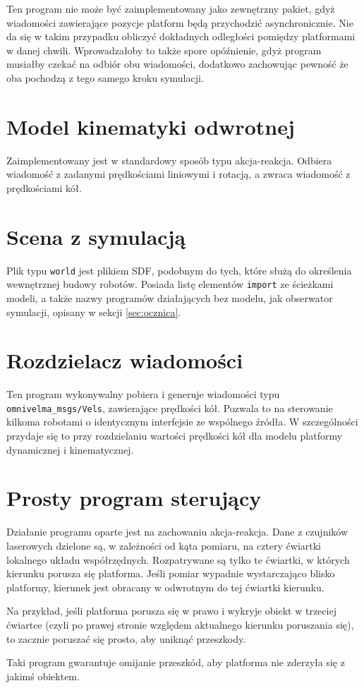 	Ten program nie może być zaimplementowany jako zewnętrzny pakiet, gdyż wiadomości zawierające pozycje platform będą przychodzić asynchronicznie.
	Nie da się w takim przypadku obliczyć dokładnych odległości pomiędzy platformami w danej chwili. 
	Wprowadzałoby to także spore opóźnienie, gdyż program musiałby czekać na odbiór obu wiadomości, dodatkowo zachowując pewność że oba pochodzą z tego samego kroku symulacji.
	
\section{Model kinematyki odwrotnej}
	Zaimplementowany jest w standardowy sposób typu akcja-reakcja.
	Odbiera wiadomość z zadanymi prędkościami liniowymi i rotacją, a zwraca wiadomość z prędkościami kół.
	
\section{Scena z symulacją}
	Plik typu \texttt{world} jest plikiem SDF, podobnym do tych, które służą do określenia wewnętrznej budowy robotów.
	Posiada listę elementów \texttt{import} ze ścieżkami modeli, a także nazwy programów działających bez modelu, jak obserwator symulacji, opisany w sekcji \ref{sec:ocznica}.

\section{Rozdzielacz wiadomości}
	Ten program wykonywalny pobiera i generuje wiadomości typu \texttt{omnivelma\_msgs/Vels}, zawierające prędkości kół.
	Pozwala to na sterowanie kilkoma robotami o identycznym interfejsie ze wspólnego źródła.
	W szczególności przydaje się to przy rozdzielaniu wartości prędkości kół dla modelu platformy dynamicznej i kinematycznej.

\section{Prosty program sterujący}
	Działanie programu oparte jest na zachowaniu akcja-reakcja.
	Dane z czujników laserowych dzielone są, w zależności od kąta pomiaru, na cztery ćwiartki lokalnego układu współrzędnych.
	Rozpatrywane są tylko te ćwiartki, w których kierunku porusza się platforma.
	Jeśli pomiar wypadnie wystarczająco blisko platformy, kierunek jest obracany w odwrotnym do tej ćwiartki kierunku.
	
	Na przykład, jeśli platforma porusza się w prawo i wykryje obiekt w trzeciej ćwiartce (czyli po prawej stronie względem aktualnego kierunku poruszania się),
	to zacznie poruszać się prosto, aby uniknąć przeszkody.
	
	Taki program gwarantuje omijanie przeszkód, aby platforma nie zderzyła się z jakimś obiektem.
